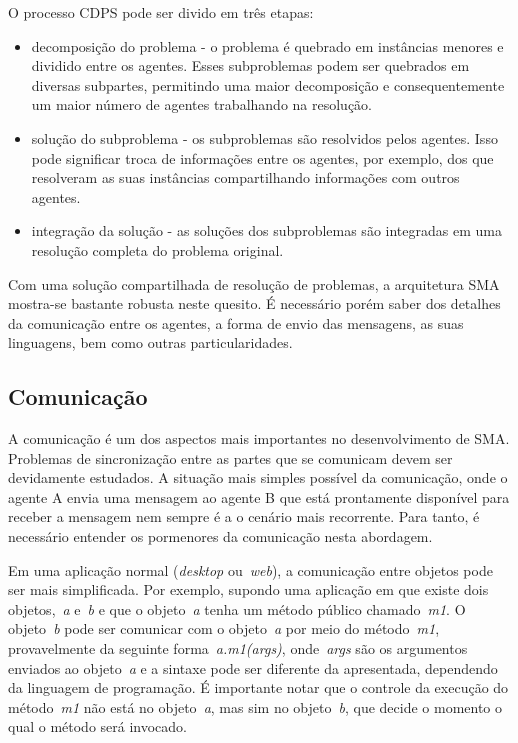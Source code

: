 O processo CDPS pode ser divido em três etapas:
\begin{itemize}
	\item decomposição do problema - o problema é quebrado em instâncias menores e dividido entre os agentes. Esses subproblemas podem ser quebrados em diversas subpartes, permitindo uma maior decomposição e consequentemente um maior número de agentes trabalhando na resolução.
	\item solução do subproblema - os subproblemas são resolvidos pelos agentes. Isso pode significar troca de informações entre os agentes, por exemplo, dos que resolveram as suas instâncias compartilhando informações com outros agentes.
	\item integração da solução - as soluções dos subproblemas são integradas em uma resolução completa do problema original.
\end{itemize}

Com uma solução compartilhada de resolução de problemas, a arquitetura SMA mostra-se bastante robusta neste quesito. É necessário porém saber dos detalhes da comunicação entre os agentes, a forma de envio das mensagens, as suas linguagens, bem como outras particularidades.

\subsection{Comunicação}

A comunicação é um dos aspectos mais importantes no desenvolvimento de SMA. Problemas de sincronização entre as partes que se comunicam devem ser devidamente estudados. A situação mais simples possível da comunicação, onde o agente A envia uma mensagem ao agente B que está prontamente disponível para receber a mensagem nem sempre é a o cenário mais recorrente. Para tanto, é necessário entender os pormenores da comunicação nesta abordagem.

Em uma aplicação normal (\emph{desktop} ou~\emph{web}), a comunicação entre objetos pode ser mais simplificada. Por exemplo, supondo uma aplicação em que existe dois objetos,~\emph{a} e~\emph{b} e que o objeto~\emph{a} tenha um método público chamado~\emph{m1}. O objeto~\emph{b} pode ser comunicar com o objeto~\emph{a} por meio do método~\emph{m1}, provavelmente da seguinte forma~\emph{a.m1(args)}, onde~\emph{args} são os argumentos enviados ao objeto~\emph{a} e a sintaxe pode ser diferente da apresentada, dependendo da linguagem de programação. É importante notar que o controle da execução do método~\emph{m1} não está no objeto~\emph{a}, mas sim no objeto~\emph{b}, que decide o momento o qual o método será invocado.

